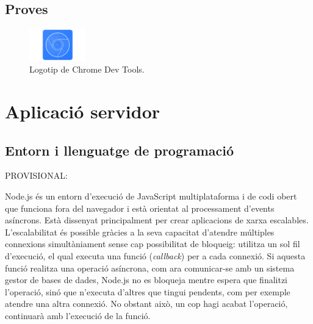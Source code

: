 \documentclass[a4paper,12pt]{ThesisStyle}
\begin{document}
\subsection{Proves}
\label{subsec:decisions_client_proves}


\begin{figure}[H]
  \centering
  \includegraphics[width=0.22\textwidth]{assets/logos/ChromeDevTools.png}
  \caption{\label{img:logo_chrome_dev_tools}Logotip de Chrome Dev Tools.}
\end{figure}

\section{Aplicació servidor}
\label{sec:decisions_servidor}




\subsection{Entorn i llenguatge de programació}
\label{subsec:decisions_servidor_entorn}

PROVISIONAL:

Node.js és un entorn d'execució de JavaScript multiplataforma i de codi obert que funciona fora del navegador i està orientat al processament d'events asíncrons. Està dissenyat principalment per crear aplicacions de xarxa escalables. L'escalabilitat és possible gràcies a la seva capacitat d'atendre múltiples connexions simultàniament sense cap possibilitat de bloqueig: utilitza un sol fil d'execució, el qual executa una funció (\textit{callback}) per a cada connexió. Si aquesta funció realitza una operació asíncrona, com ara comunicar-se amb un sistema gestor de bases de dades, Node.js no es bloqueja mentre espera que finalitzi l'operació, sinó que n'executa d'altres que tingui pendents, com per exemple atendre una altra connexió. No obstant això, un cop hagi acabat l'operació, continuarà amb l'execució de la funció.
\end{document}
